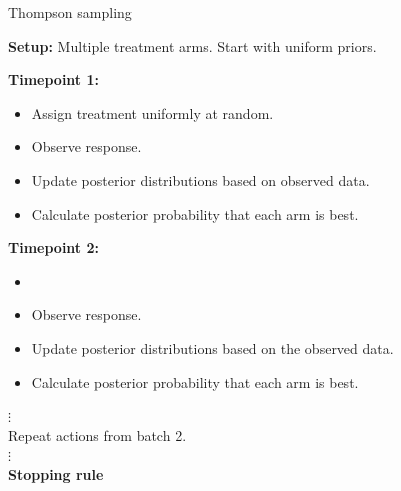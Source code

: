 \documentclass[xcolor={table}]{beamer}
\begin{document}
\begin{frame}{Thompson sampling}
\scriptsize

\textbf{Setup:} Multiple treatment arms. Start with uniform priors.

 \textbf{Timepoint 1:} 
\begin{itemize}
\item Assign treatment uniformly at random. 
\item Observe response. 
\item Update posterior distributions based on observed data.
\item Calculate posterior probability that each arm is best. %
\end{itemize}

 \textbf{Timepoint 2:} 
\begin{itemize}
\item {}
\item Observe response. 
\item Update posterior distributions based on the observed data. 
\item Calculate posterior probability that each arm is best.\\
\end{itemize}

\hspace{15 pt} $\vdots$\\
Repeat actions from batch 2. \\
\hspace{15 pt} $\vdots$\\
 \textbf{Stopping rule} 

\hyperlink{ts}{}\hypertarget<7>{ts-explainer}{}
\end{frame}
\end{document}
